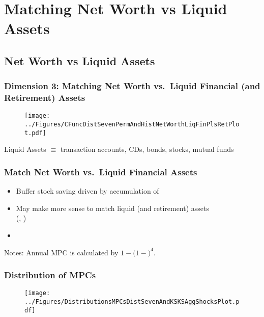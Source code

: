 \section{Matching Net Worth vs Liquid Assets}
\subsection{Net Worth vs Liquid Assets}
\begin{frame}[label=cfuncVsLiq]
\frametitle{Dimension 3: Matching Net Worth vs.\ Liquid Financial (and Retirement) Assets}
\begin{figure}
\centering
\texttt{[image: ../Figures/CFuncDistSevenPermAndHistNetWorthLiqFinPlsRetPlot.pdf]}
\end{figure}
{\footnotesize Liquid Assets $\equiv$ transaction accounts,
CDs, bonds, stocks, mutual funds}
\end{frame}


\begin{frame}
\frametitle{{Match Net Worth vs.\ Liquid Financial Assets
}}

\begin{itemize}
  \item Buffer stock saving driven by accumulation of 
  \item May make more sense to match liquid (and retirement) assets\\ (\citet{hall:slump}, \citet{kvStim})
  \item {}
\end{itemize}

\begin{footnotesize}
\begin{table}

\end{table}
\tiny{Notes: Annual MPC is calculated by $1-(1-$$)^{4}$.}
\end{footnotesize}

\end{frame}





\begin{frame}[label=cfunc]
\frametitle{{Distribution of MPCs}}

{}

\begin{figure}
\centering
\texttt{[image: ../Figures/DistributionsMPCsDistSevenAndKSKSAggShocksPlot.pdf]}

\end{figure}

\end{frame}



